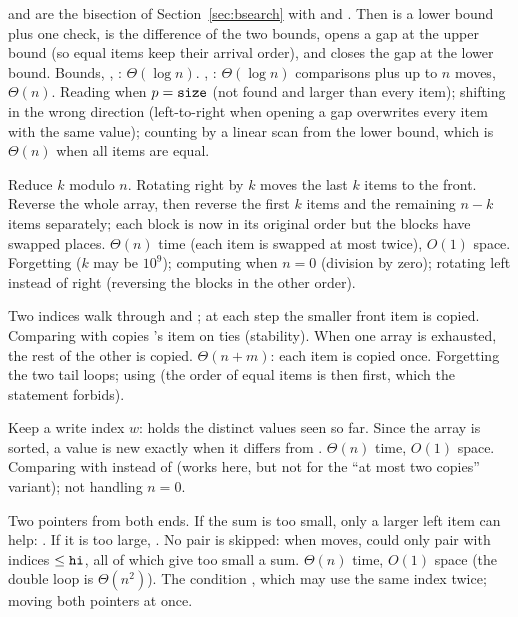 \idea {} and  are the bisection of Section~\ref{sec:bsearch}
with \cc{<} and \cc{<=}. Then  is a lower bound plus one check,  is
the difference of the two bounds,  opens a gap at the upper bound (so equal
items keep their arrival order), and  closes the gap at the lower bound.
\complexity Bounds, , : $\Theta(\log n)$. , :
$\Theta(\log n)$ comparisons plus up to $n$ moves, $\Theta(n)$.
\mistakes Reading  when $p=\texttt{size}$ (not found and larger than every
item); shifting in the wrong direction (left-to-right when opening a gap overwrites every
item with the same value); counting by a linear scan from the lower bound, which is
$\Theta(n)$ when all items are equal.

\idea Reduce $k$ modulo $n$. Rotating right by $k$ moves the last $k$ items to the front.
Reverse the whole array, then reverse the first $k$ items and the remaining $n-k$ items
separately; each block is now in its original order but the blocks have swapped places.
\complexity $\Theta(n)$ time (each item is swapped at most twice), $O(1)$ space.
\mistakes Forgetting  ($k$ may be $10^9$); computing  when $n=0$
(division by zero); rotating left instead of right (reversing the blocks in the other
order).

\idea Two indices walk through  and ; at each step the smaller front item is
copied. Comparing with \cc{<=} copies 's item on ties (stability). When one array
is exhausted, the rest of the other is copied.
\complexity $\Theta(n+m)$: each item is copied once.
\mistakes Forgetting the two tail loops; using \cc{<} (the order of equal items is then
 first, which the statement forbids).

\idea Keep a write index $w$:  holds the distinct values seen so far. Since
the array is sorted, a value is new exactly when it differs from .
\complexity $\Theta(n)$ time, $O(1)$ space.
\mistakes Comparing with  instead of  (works here, but not for the
``at most two copies'' variant); not handling $n=0$.

\idea Two pointers from both ends. If the sum is too small, only a larger left item can
help: . If it is too large, . No pair is skipped: when  moves,
 could only pair with indices $\le\texttt{hi}$, all of which give too small a sum.
\complexity $\Theta(n)$ time, $O(1)$ space (the double loop is $\Theta(n^2)$).
\mistakes The condition , which may use the same index twice; moving both
pointers at once.

